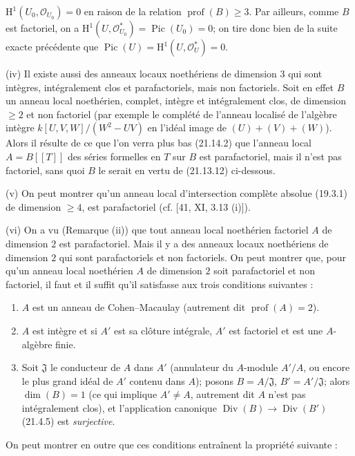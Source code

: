 $\mathrm H^1(U_0,\mathcal O_{U_0})=0$ en raison de la relation
$\operatorname{prof}(B)\geq3$. Par ailleurs, comme $B$ est factoriel, on a
$\mathrm H^1(U,\mathcal O_{U_0}^*)=\operatorname{Pic}(U_0)=0$; on tire donc bien de
la suite exacte précédente que
$\operatorname{Pic}(U)=\mathrm H^1(U,\mathcal O_U^*)=0$.

(iv) Il existe aussi des anneaux locaux noethériens de dimension $3$ qui sont
intègres, intégralement clos et parafactoriels, mais non factoriels. Soit en effet $B$
un anneau local noethérien, complet, intègre et intégralement clos, de dimension
$\geq2$ et non factoriel (par exemple le complété de l'anneau localisé de l'algèbre
intègre $k[U,V,W]/(W^2-UV)$ en l'idéal image de $(U)+(V)+(W)$). Alors il résulte de
ce que l'on verra plus bas (21.14.2) que l'anneau local $A=B[[T]]$ des séries formelles
en $T$ sur $B$ est parafactoriel, mais il n'est pas factoriel, sans quoi $B$ le serait
en vertu de (21.13.12) ci-dessous.

(v) On peut montrer qu'un anneau local d'intersection complète absolue (19.3.1) de
dimension $\geq4$, est parafactoriel (cf. [41, XI, 3.13 (i)]).

(vi) On a vu (Remarque (ii)) que tout anneau local noethérien factoriel $A$ de
dimension $2$ est parafactoriel. Mais il y a des anneaux locaux noethériens de
dimension $2$ qui sont parafactoriels et non factoriels. On peut montrer que, pour
qu'un anneau local noethérien $A$ de dimension $2$ soit parafactoriel et non
factoriel, il faut et il suffit qu'il satisfasse aux trois conditions suivantes :
\begin{enumerate}[label=\arabic*\textsuperscript{o}]
  \item $A$ est un anneau de Cohen--Macaulay (autrement dit
  $\operatorname{prof}(A)=2$).
  \item $A$ est intègre et si $A'$ est sa clôture intégrale, $A'$ est factoriel et est
  une $A$-algèbre finie.
  \item Soit $\mathfrak J$ le conducteur de $A$ dans $A'$ (annulateur du $A$-module
  $A'/A$, ou encore le plus grand idéal de $A'$ contenu dans $A$); posons
  $B=A/\mathfrak J$, $B'=A'/\mathfrak J$; alors $\dim(B)=1$ (ce qui implique
  $A'\neq A$, autrement dit $A$ n'est pas intégralement clos), et l'application
  canonique $\operatorname{Div}(B)\to\operatorname{Div}(B')$ (21.4.5) est
  \emph{surjective}.
\end{enumerate}
On peut montrer en outre que ces conditions entraînent la propriété suivante :

